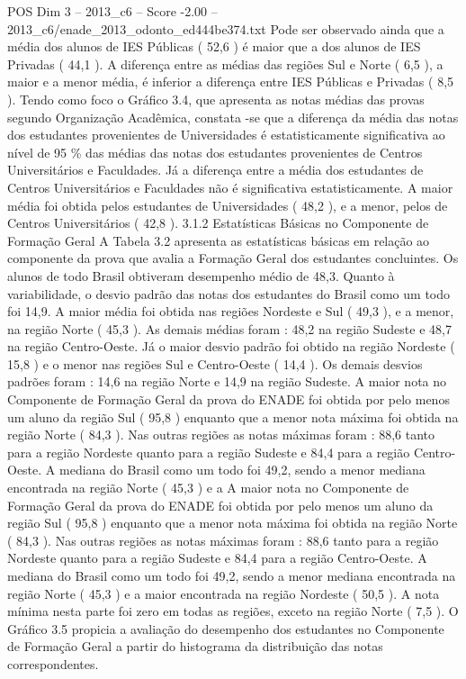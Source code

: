 \begin{textsample}{POS Dim 3 – 2013\_c6 – Score -2.00 – 2013\_c6/enade\_2013\_odonto\_ed444be374.txt}
Pode ser observado ainda que a média dos alunos de IES Públicas ( 52,6 ) é maior que a dos alunos de IES Privadas ( 44,1 ).
A diferença entre as médias das regiões Sul e Norte ( 6,5 ), a maior e a menor média, é inferior a diferença entre IES Públicas e Privadas ( 8,5 ).
Tendo como foco o Gráfico 3.4, que apresenta as notas médias das provas segundo Organização Acadêmica, constata -se que a diferença da média das notas dos estudantes provenientes de Universidades é estatisticamente significativa ao nível de 95 \% das médias das notas dos estudantes provenientes de Centros Universitários e Faculdades.
Já a diferença entre a média dos estudantes de Centros Universitários e Faculdades não é significativa estatisticamente.
A maior média foi obtida pelos estudantes de Universidades ( 48,2 ), e a menor, pelos de Centros Universitários ( 42,8 ). 3.1.2 Estatísticas Básicas no Componente de Formação Geral A Tabela 3.2 apresenta as estatísticas básicas em relação ao componente da prova que avalia a Formação Geral dos estudantes concluintes.
Os alunos de todo Brasil obtiveram desempenho médio de 48,3.
Quanto à variabilidade, o desvio padrão das notas dos estudantes do Brasil como um todo foi 14,9.
A maior média foi obtida nas regiões Nordeste e Sul ( 49,3 ), e a menor, na região Norte ( 45,3 ).
As demais médias foram : 48,2 na região Sudeste e 48,7 na região Centro-Oeste.
Já o maior desvio padrão foi obtido na região Nordeste ( 15,8 ) e o menor nas regiões Sul e Centro-Oeste ( 14,4 ).
Os demais desvios padrões foram : 14,6 na região Norte e 14,9 na região Sudeste.
A maior nota no Componente de Formação Geral da prova do ENADE foi obtida por pelo menos um aluno da região Sul ( 95,8 ) enquanto que a menor nota máxima foi obtida na região Norte ( 84,3 ).
Nas outras regiões as notas máximas foram : 88,6 tanto para a região Nordeste quanto para a região Sudeste e 84,4 para a região Centro-Oeste.
A mediana do Brasil como um todo foi 49,2, sendo a menor mediana encontrada na região Norte ( 45,3 ) e a A maior nota no Componente de Formação Geral da prova do ENADE foi obtida por pelo menos um aluno da região Sul ( 95,8 ) enquanto que a menor nota máxima foi obtida na região Norte ( 84,3 ).
Nas outras regiões as notas máximas foram : 88,6 tanto para a região Nordeste quanto para a região Sudeste e 84,4 para a região Centro-Oeste.
A mediana do Brasil como um todo foi 49,2, sendo a menor mediana encontrada na região Norte ( 45,3 ) e a maior encontrada na região Nordeste ( 50,5 ).
A nota mínima nesta parte foi zero em todas as regiões, exceto na região Norte ( 7,5 ).
O Gráfico 3.5 propicia a avaliação do desempenho dos estudantes no Componente de Formação Geral a partir do histograma da distribuição das notas correspondentes.

\end{textsample}
